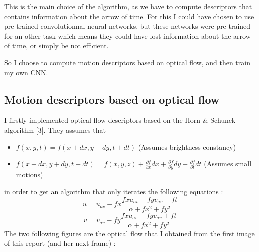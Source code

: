\documentclass[10pt,a4paper]{report}
\begin{document}
		This is the main choice of the algorithm, as we have to compute descriptors that contains information about the arrow of time. For this I could have chosen to use pre-trained convolutionnal neural networks, but these networks were pre-trained for an other task which means they could have lost information about the arrow of time, or simply be not efficient.
		
		So I choose to compute motion descriptors based on optical flow, and then train my own CNN.  
		
		\subsection*{Motion descriptors based on optical flow}
		
		I firstly implemented optical flow descriptors based on the Horn \& Schunck algorithm [3]. They assumes that
		\begin{itemize}
			\item $f(x,y,t) = f(x+dx, y+dy, t+dt)$ (Assumes brightness constancy)
			\item $f(x+dx,y+dy,t+dt) = f(x,y,z) + \frac{\partial f}{\partial x}dx + \frac{\partial f}{\partial y}dy + \frac{\partial f}{\partial t}dt$ (Assumes small motions)
		\end{itemize}
		in order to get an algorithm that only iterates the following equations :
		\[u = u_{av} - fx\frac{fx u_{av} + fy v_{av} + ft}{\alpha + fx^2 + fy^2}\]
		\[v = v_{av} - fy\frac{fx u_{av} + fy v_{av} + ft}{\alpha + fx^2 + fy^2}\]
		The two following figures are the optical flow that I obtained from the first image of this report (and her next frame) :
\end{document}
